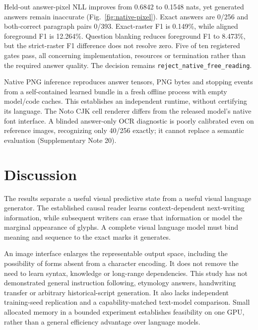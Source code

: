 Held-out answer-pixel NLL improves from 0.6842 to 0.1548 nats, yet generated
answers remain inaccurate (Fig.~\ref{fig:native-pixel}). Exact answers are
0/256 and both-correct paragraph pairs 0/393. Exact-raster F1 is 0.149\%,
while aligned foreground F1 is 12.264\%. Question blanking reduces foreground
F1 to 8.473\%, but the strict-raster F1 difference does not resolve zero.
Five of ten registered gates pass, all concerning implementation, resources
or termination rather than the required answer quality. The decision remains
\texttt{reject\_native\_free\_reading}.

Native PNG inference reproduces answer tensors, PNG bytes and stopping events
from a self-contained learned bundle in a fresh offline process with empty
model/code caches. This establishes an independent runtime, without certifying
its language. The Noto CJK cell renderer differs from the released model's
native font interface. A blinded answer-only OCR diagnostic is poorly
calibrated even on reference images, recognizing only 40/256 exactly; it
cannot replace a semantic evaluation (Supplementary Note 20).


\section*{Discussion}
The results separate a useful visual predictive state from a useful visual
language generator. The established causal reader learns context-dependent
next-writing information, while subsequent writers can erase that information
or model the marginal appearance of glyphs. A complete visual language model
must bind meaning and sequence to the exact marks it generates.

An image interface enlarges the representable output space, including the
possibility of forms absent from a character encoding. It does not remove the
need to learn syntax, knowledge or long-range dependencies. This study has not
demonstrated general instruction following, etymology answers, handwriting
transfer or arbitrary historical-script generation. It also lacks independent
training-seed replication and a capability-matched text-model comparison.
Small allocated memory in a bounded experiment establishes feasibility on one
GPU, rather than a general efficiency advantage over language models.

